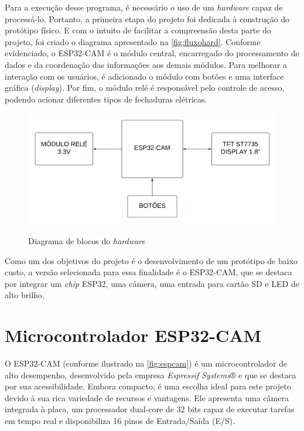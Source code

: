 Para a execução desse programa, é necessário o uso de um \textit{hardware}
capaz de processá-lo. Portanto, a primeira etapa do projeto foi dedicada à
construção do protótipo físico. E com o intuito de facilitar a compreensão desta
parte do projeto, foi criado o diagrama apresentado na \autoref{fig:fluxohard}.
Conforme evidenciado, o ESP32-CAM é o módulo central, encarregado do
processamento de dados e da coordenação das informações aos demais módulos.
Para melhorar a interação com os usuários, é adicionado o módulo com botões e
uma interface gráfica (\textit{display}). Por fim, o módulo relé é
responsável pelo controle de acesso, podendo acionar diferentes tipos de
fechaduras elétricas.

\begin{figure}[h!]
    \centering
    \caption{Diagrama de blocos do \textit{hardware}}
    \includegraphics[scale=0.22]{figuras/diagrama_hardware.png}
    \fonte{}%
    \label{fig:fluxohard}
    \centering
\end{figure}

Como um dos objetivos do projeto é o desenvolvimento de um protótipo de
baixo custo, a versão selecionada para essa finalidade é o ESP32-CAM,
que se destaca por integrar um \textit{chip} ESP32, uma câmera, uma
entrada para cartão SD e LED de alto brilho.

\section{Microcontrolador ESP32-CAM}\label{sec:materiais}

O ESP32-CAM (conforme ilustrado na \autoref{fig:espcam}) é um
microcontrolador de alto desempenho, desenvolvido pela empresa
\textit{Espressif Systems}® e que se destaca por sua acessibilidade.
Embora compacto, é uma escolha ideal para este projeto devido à sua
rica variedade de recursos e vantagens. Ele apresenta uma câmera
integrada à placa, um processador dual-core de 32 bits capaz de
executar tarefas em tempo real e disponibiliza 16 pinos de
Entrada/Saída (E/S).

